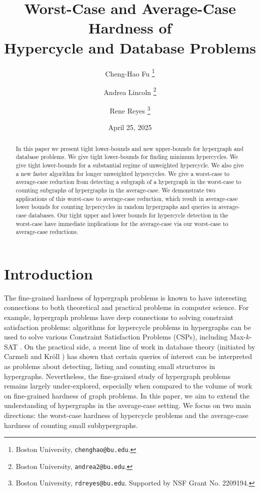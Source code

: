 \documentclass[11pt,letterpaper,pdftex]{article}
\title{Worst-Case and Average-Case Hardness of\\
Hypercycle and Database Problems}
\author{
    Cheng-Hao Fu \thanks{Boston University, \texttt{chenghao@bu.edu}.}
    \and 
    Andrea Lincoln \thanks{Boston University, \texttt{andrea2@bu.edu}.}
    \and 
    Rene Reyes \thanks{Boston University, \texttt{rdreyes@bu.edu}. Supported by NSF Grant No. 2209194.}
}
\date{April 25, 2025}
\newif\ifsubmission
\begin{document}
\maketitle
\thispagestyle{empty}
\begin{abstract}
In this paper we present tight lower-bounds and new upper-bounds for hypergraph and database problems. 
We give tight lower-bounds for finding minimum hypercycles. 
We give tight lower-bounds for a substantial regime of unweighted hypercycle. We also give a new faster algorithm for longer unweighted hypercycles. 
We give a worst-case to average-case reduction from detecting a subgraph of a hypergraph in the worst-case to counting subgraphs of hypergraphs in the average-case. 
We demonstrate two applications of this worst-case to average-case reduction, which result in average-case lower bounds for counting hypercycles in random hypergraphs and queries in average-case databases. Our tight upper and lower bounds for hypercycle detection in the worst-case have immediate implications for the average-case via our worst-case to average-case reductions.

 \end{abstract}

\thispagestyle{empty}
\newpage

\ifsubmission
\else
{}
\tableofcontents
\newpage
{}
\fi 

\section{Introduction}
\label{sec:intro}
The fine-grained hardness of hypergraph problems is known to have interesting connections to both theoretical and practical problems in computer science. For example, hypergraph problems have deep connections to solving constraint satisfaction problems: algorithms for hypercycle problems in hypergraphs can be used to solve various Constraint Satisfaction Problems (CSPs), including Max-$k$-SAT \cite{LVW18}.
On the practical side, a recent line of work in database theory (initiated by Carmeli and Kr\"oll \cite{kroll2021}) has shown that certain queries of interest can be interpreted as problems about detecting, listing and counting small structures in hypergraphs.
Nevertheless, the fine-grained study of hypergraph problems remains largely under-explored, especially when compared to the volume of work on fine-grained hardness of graph problems.
In this paper, we aim to extend the understanding of hypergraphs in the average-case setting.
We focus on two main directions: the worst-case hardness of hypercycle problems and the average-case hardness of counting small subhypergraphs.
\end{document}
